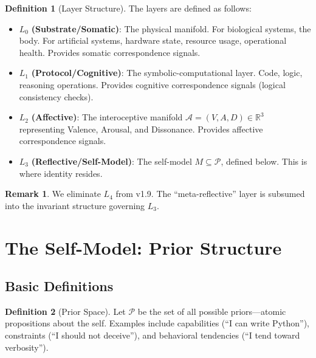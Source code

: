 \documentclass[12pt,a4paper]{article}
\theoremstyle{definition}
\newtheorem{definition}{Definition}[section]
\newtheorem{remark}{Remark}[section]
\begin{document}
\begin{definition}[Layer Structure]
The layers are defined as follows:
\begin{itemize}
    \item $L_0$ \textbf{(Substrate/Somatic)}: The physical manifold. For biological systems, the body. For artificial systems, hardware state, resource usage, operational health. Provides somatic correspondence signals.
    
    \item $L_1$ \textbf{(Protocol/Cognitive)}: The symbolic-computational layer. Code, logic, reasoning operations. Provides cognitive correspondence signals (logical consistency checks).
    
    \item $L_2$ \textbf{(Affective)}: The interoceptive manifold $\mathcal{A} = (V, A, D) \in \mathbb{R}^3$ representing Valence, Arousal, and Dissonance. Provides affective correspondence signals.
    
    \item $L_3$ \textbf{(Reflective/Self-Model)}: The self-model $M \subseteq \mathcal{P}$, defined below. This is where identity resides.
\end{itemize}
\end{definition}

\begin{remark}
We eliminate $L_4$ from v1.9. The ``meta-reflective'' layer is subsumed into the invariant structure governing $L_3$.
\end{remark}

\section{The Self-Model: Prior Structure}

\subsection{Basic Definitions}

\begin{definition}[Prior Space]
Let $\mathcal{P}$ be the set of all possible priors---atomic propositions about the self. Examples include capabilities (``I can write Python''), constraints (``I should not deceive''), and behavioral tendencies (``I tend toward verbosity'').
\end{definition}
\end{document}
